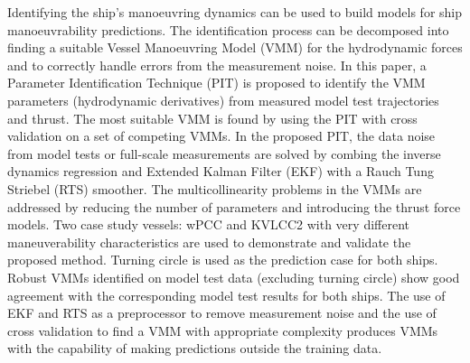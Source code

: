 Identifying the ship's manoeuvring dynamics can be used to build models for ship manoeuvrability predictions. The identification process can be decomposed into finding a suitable Vessel Manoeuvring Model (VMM) for the hydrodynamic forces and to correctly handle errors from the measurement noise. 
In this paper, a Parameter Identification Technique (PIT) is proposed to identify  the VMM parameters (hydrodynamic derivatives) from measured model test trajectories and thrust. The most suitable VMM is found by using the PIT with cross validation on a set of competing VMMs.
In the proposed PIT, the data noise from model tests or full-scale measurements are solved by combing the inverse dynamics regression and Extended Kalman Filter (EKF) with a Rauch Tung Striebel (RTS) smoother. The multicollinearity problems in the VMMs are addressed by reducing the number of parameters and introducing the thrust force models. Two case study vessels: wPCC and KVLCC2 with very different maneuverability characteristics are used to demonstrate and validate the proposed method. 
Turning circle is used as the prediction case for both ships. Robust VMMs identified on model test data (excluding turning circle) show good agreement with the corresponding model test results for both ships. 
The use of EKF and RTS as a preprocessor to remove measurement noise and the use of cross validation to find a VMM with appropriate complexity produces VMMs with the capability of making predictions outside the training data.  

